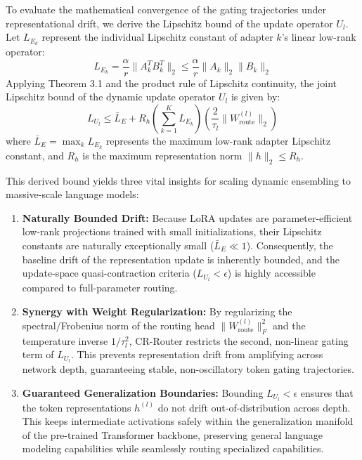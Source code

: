 To evaluate the mathematical convergence of the gating trajectories under representational drift, we derive the Lipschitz bound of the update operator $U_l$. Let $L_{E_k}$ represent the individual Lipschitz constant of adapter $k$'s linear low-rank operator:
\begin{equation}
L_{E_k} = \frac{\alpha}{r} \|A_k^T B_k^T\|_2 \le \frac{\alpha}{r} \|A_k\|_2 \|B_k\|_2
\end{equation}
Applying Theorem 3.1 and the product rule of Lipschitz continuity, the joint Lipschitz bound of the dynamic update operator $U_l$ is given by:
\begin{equation}
L_{U_l} \le \bar{L}_{E} + R_h \left( \sum_{k=1}^K L_{E_k} \right) \left( \frac{2}{\tau_l} \|W_{\text{route}}^{(l)}\|_2 \right)
\end{equation}
where $\bar{L}_E = \max_{k} L_{E_k}$ represents the maximum low-rank adapter Lipschitz constant, and $R_h$ is the maximum representation norm $\|h\|_2 \le R_h$.

This derived bound yields three vital insights for scaling dynamic ensembling to massive-scale language models:
\begin{enumerate}
  \item \textbf{Naturally Bounded Drift:} Because LoRA updates are parameter-efficient low-rank projections trained with small initializations, their Lipschitz constants are naturally exceptionally small ($\bar{L}_E \ll 1$). Consequently, the baseline drift of the representation update is inherently bounded, and the update-space quasi-contraction criteria ($L_{U_l} < \epsilon$) is highly accessible compared to full-parameter routing.
  \item \textbf{Synergy with Weight Regularization:} By regularizing the spectral/Frobenius norm of the routing head $\|W_{\text{route}}^{(l)}\|_F^2$ and the temperature inverse $1/\tau_l^2$, CR-Router restricts the second, non-linear gating term of $L_{U_l}$. This prevents representation drift from amplifying across network depth, guaranteeing stable, non-oscillatory token gating trajectories.
  \item \textbf{Guaranteed Generalization Boundaries:} Bounding $L_{U_l} < \epsilon$ ensures that the token representations $h^{(l)}$ do not drift out-of-distribution across depth. This keeps intermediate activations safely within the generalization manifold of the pre-trained Transformer backbone, preserving general language modeling capabilities while seamlessly routing specialized capabilities.
\end{enumerate}

